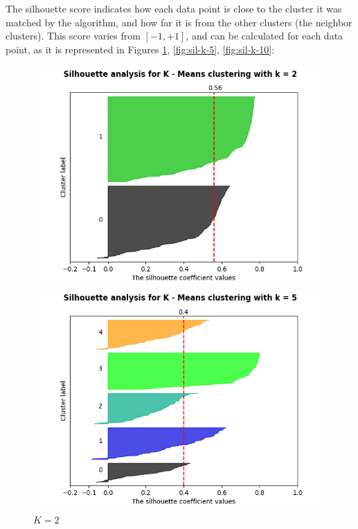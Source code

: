\documentclass[12pt]{article}
\begin{document}
The silhouette score indicates how each data point is close to the cluster it was matched by the algorithm, and how far it is from the other clusters (the neighbor clusters). This score varies from $[-1, +1]$, and can be calculated for each data point, as it is represented in Figures \ref{fig:sil-k-2}, \ref{fig:sil-k-5}, \ref{fig:sil-k-10}: \\

\begin{figure}[H]
   \begin{minipage}{0.32\textwidth}
     \centering
     \includegraphics[width=\linewidth]{assignment-1/plots/silhouette-plot-k-2.png}
     \caption{$K = 2$}
     \label{fig:sil-k-2}
   \end{minipage}\hfill
   \begin{minipage}{0.32\textwidth}
     \centering
     \includegraphics[width=\linewidth]{assignment-1/plots/silhouette-plot-k-5.png}

\end{minipage}
\end{figure}
\end{document}
